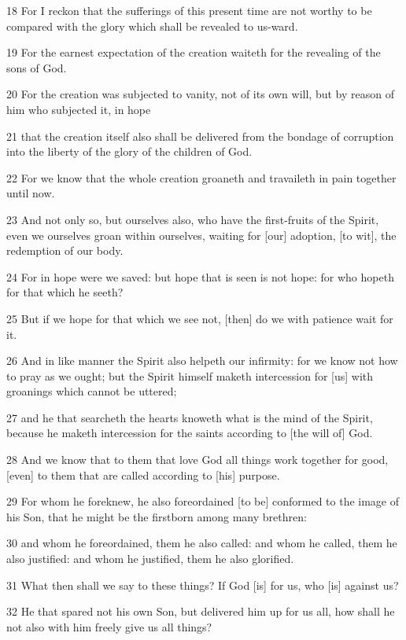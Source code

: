 \par 18 For I reckon that the sufferings of this present time are not worthy to be compared with the glory which shall be revealed to us-ward.
\par 19 For the earnest expectation of the creation waiteth for the revealing of the sons of God.
\par 20 For the creation was subjected to vanity, not of its own will, but by reason of him who subjected it, in hope
\par 21 that the creation itself also shall be delivered from the bondage of corruption into the liberty of the glory of the children of God.
\par 22 For we know that the whole creation groaneth and travaileth in pain together until now.
\par 23 And not only so, but ourselves also, who have the first-fruits of the Spirit, even we ourselves groan within ourselves, waiting for [our] adoption, [to wit], the redemption of our body.
\par 24 For in hope were we saved: but hope that is seen is not hope: for who hopeth for that which he seeth?
\par 25 But if we hope for that which we see not, [then] do we with patience wait for it.
\par 26 And in like manner the Spirit also helpeth our infirmity: for we know not how to pray as we ought; but the Spirit himself maketh intercession for [us] with groanings which cannot be uttered;
\par 27 and he that searcheth the hearts knoweth what is the mind of the Spirit, because he maketh intercession for the saints according to [the will of] God.
\par 28 And we know that to them that love God all things work together for good, [even] to them that are called according to [his] purpose.
\par 29 For whom he foreknew, he also foreordained [to be] conformed to the image of his Son, that he might be the firstborn among many brethren:
\par 30 and whom he foreordained, them he also called: and whom he called, them he also justified: and whom he justified, them he also glorified.
\par 31 What then shall we say to these things? If God [is] for us, who [is] against us?
\par 32 He that spared not his own Son, but delivered him up for us all, how shall he not also with him freely give us all things?
